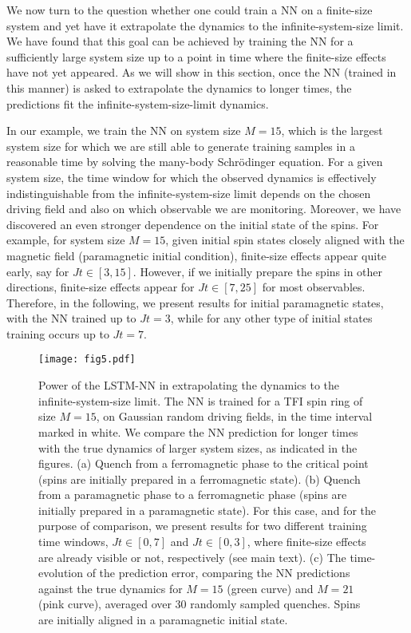 \documentclass[a4paper,aps,amsmath,amssymb,twocolumn,longbibliography,,accepted=2022-05-17]{quantumarticle}
\begin{document}
We now turn to the question whether one could train a NN on a finite-size system and yet have it extrapolate the dynamics to the infinite-system-size limit. We have found that this goal can be achieved by training the NN for a sufficiently large system size up to a point in time where the finite-size effects have not yet appeared. As we will show in this section, once the NN (trained in this manner) is asked to extrapolate the dynamics to longer times, the predictions fit the infinite-system-size-limit dynamics.

In our example, we train the NN on system size $M=15$, which is the largest system size for which we are still able to generate training samples in a reasonable time by solving the many-body Schr\"odinger equation. For a given system size, the time window for which the observed dynamics is effectively indistinguishable from the infinite-system-size limit depends on the chosen driving field and also on which observable we are monitoring. Moreover, we have discovered an even stronger dependence on the initial state of the spins. For example, for system size $M=15$, given initial spin states closely aligned with the magnetic field (paramagnetic initial condition), finite-size effects appear quite early, say for $Jt\in[3,15]$. However, if we initially prepare the spins in other directions, finite-size effects appear for $Jt\in[7,25]$ for most observables. Therefore, in the following, we present results for initial paramagnetic states, with the NN trained up to $Jt=3$, while for any other type of initial states training occurs up to $Jt=7$.
\begin{figure*}[!ht]
	\centering
	\texttt{[image: fig5.pdf]}
	\caption{
		Power of the LSTM-NN in extrapolating the dynamics to the infinite-system-size limit. The NN is trained for a TFI spin ring of size $M=15$, on Gaussian random driving fields, in the time interval marked in white. We compare the NN prediction for longer times with the true dynamics of larger system sizes, as indicated in the figures.
		(a) Quench from a ferromagnetic phase to the critical point (spins are initially prepared in a ferromagnetic state).
		(b) Quench from a paramagnetic phase to a ferromagnetic phase (spins are initially prepared in a paramagnetic state). For this case, and for the purpose of comparison, we present results for two different training time windows, $Jt\in[0,7]$ and $Jt\in[0,3]$, where finite-size effects are already visible or not, respectively (see main text).
		(c) The time-evolution of the prediction error, comparing the NN predictions against the true dynamics for $M=15$ (green curve) and $M=21$ (pink curve), averaged over 30 randomly sampled quenches. Spins are initially aligned in a paramagnetic initial state. %
	}
	\label{fig4}
\end{figure*}
\end{document}
